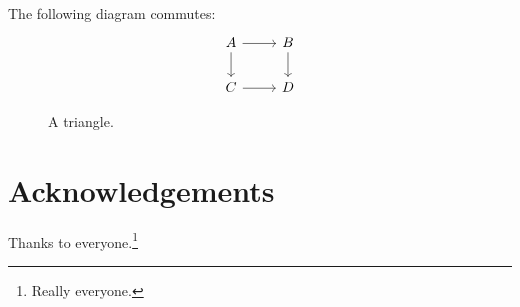 \documentclass[11pt]{article}
\theoremstyle{plain}
\theoremstyle{definition}
\begin{document}
The following diagram commutes:
\[
\begin{tikzcd}
A \arrow[r] \arrow[d] & B \arrow[d] \\
C \arrow[r] & D
\end{tikzcd}
\]

\begin{figure}[h]
\centering
{}
\caption{A triangle.}\label{fig:tri}
\end{figure}

\section*{Acknowledgements}
Thanks to everyone.\footnote{Really everyone.}



\end{document}
